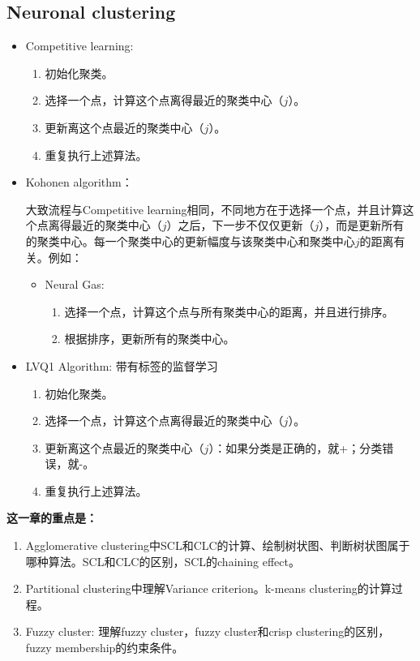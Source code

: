 \documentclass[12pt, a4paper, oneside]{ctexart}
\newenvironment{zd}{\begin{shaded}\par\noindent\textbf{这一章的重点是：}}{\end{shaded}\par}
\begin{document}
\subsection{Neuronal clustering}
\begin{itemize}
    \item Competitive learning:
    
    \begin{enumerate}
        \item 初始化聚类。
        \item 选择一个点，计算这个点离得最近的聚类中心（$j$）。
        \item 更新离这个点最近的聚类中心（$j$）。
        \item 重复执行上述算法。
    \end{enumerate}

    \item Kohonen algorithm：
    
    大致流程与Competitive learning相同，不同地方在于选择一个点，并且计算这个点离得最近的聚类中心（$j$）之后，下一步不仅仅更新（$j$），而是更新所有的聚类中心。每一个聚类中心的更新幅度与该聚类中心和聚类中心$j$的距离有关。例如：
    \begin{itemize}
        \item Neural Gas:
        
        \begin{enumerate}
            \item 选择一个点，计算这个点与所有聚类中心的距离，并且进行排序。
            \item 根据排序，更新所有的聚类中心。
        \end{enumerate}
    \end{itemize}

    \item LVQ1 Algorithm: 带有标签的监督学习
    \begin{enumerate}
        \item 初始化聚类。
        \item 选择一个点，计算这个点离得最近的聚类中心（$j$）。
        \item 更新离这个点最近的聚类中心（$j$）：如果分类是正确的，就+；分类错误，就-。
        \item 重复执行上述算法。
    \end{enumerate}  
\end{itemize}
\begin{zd}
    \begin{enumerate}
        \item Agglomerative clustering中SCL和CLC的计算、绘制树状图、判断树状图属于哪种算法。SCL和CLC的区别，SCL的chaining effect。
        \item Partitional clustering中理解Variance criterion。k-means clustering的计算过程。
        \item Fuzzy cluster: 理解fuzzy cluster，fuzzy cluster和crisp clustering的区别，fuzzy membership的约束条件。
    \end{enumerate}
\end{zd}
\end{document}
